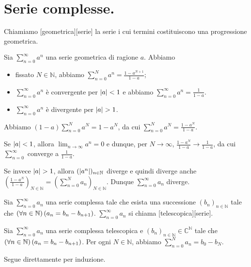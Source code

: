 \section{Serie complesse.}\label{SerieComplesse}
\begin{Definition}
	Chiamiamo [geometrica][serie] la serie i cui termini costituiscono una progressione geometrica.
\end{Definition}
\begin{Theorem}
	Sia $\sum_{n = 0}^\infty a^n$ una serie geometrica di ragione $a$. Abbiamo
	\begin{itemize}
		\item fissato $N \in \mathbb{N}$, abbiamo $\sum_{n = 0}^N a^n = \frac{1 - a^{N + 1}}{1 - a}$;
		\item $\sum_{n = 0}^\infty a^n$ \`e convergente per $\left \lvert a \right \rvert < 1$ e abbiamo $\sum_{n = 0}^\infty a^n = \frac{1}{1 - a}$.
		\item $\sum_{n = 0}^\infty a^n$ \`e divergente per $\left \lvert a \right \rvert > 1$.
	\end{itemize}
\end{Theorem}
\Proof Abbiamo $(1 - a) \sum_{n = 0}^N a^N = 1 - a^N$, da cui $\sum_{n = 0}^N a^N = \frac{1 - a^N}{1 - a}$.
\par Se $\left \lvert a \right \rvert < 1$, allora $\lim_{n \rightarrow \infty} a^n = 0$ e dunque, per $N \rightarrow \infty$, $\frac{1 - a^N}{1 - a} \rightarrow \frac{1}{1 - a}$, da cui $\sum_{n = 0}^\infty$ converge a $\frac{1}{1 - a}$.
\par Se invece $\left \lvert a \right \rvert > 1$, allora $(\left \lvert a^n \right \rvert)_{n \in \mathbb{N}}$ diverge e quindi diverge anche $\left ( \frac{1 - a^N}{1 - a} \right )_{N \in \mathbb{N}} = \left ( \sum_{n = 0}^N a_n \right )_{N \in \mathbb{N}}$. Dunque $\sum_{n = 0}^\infty a_n$ diverge. \EndProof
\begin{Definition}
	Sia $\sum_{n = 0}^\infty a_n$ una serie complessa tale che esista una successione $(b_n)_{n \in \mathbb{N}}$ tale che $\left ( \forall n \in \mathbb{N} \right ) \left ( a_n = b_n - b_{n + 1} \right )$. $\sum_{n = 0}^\infty a_n$ si chiama [telescopica][serie].
\end{Definition}
\begin{Theorem}
	Sia $\sum_{n = 0}^\infty a_n$ una serie complessa telescopica e $(b_n)_{n \in \mathbb{N}} \in \mathbb{C}^\mathbb{N}$ tale che $\left ( \forall n \in \mathbb{N} \right ) \left ( a_n = b_n - b_{n + 1} \right )$. Per ogni $N \in \mathbb{N}$, abbiamo $\sum_{n = 0}^N a_n = b_0 - b_N$.
\end{Theorem}
\Proof Segue direttamente per induzione. \EndProof
